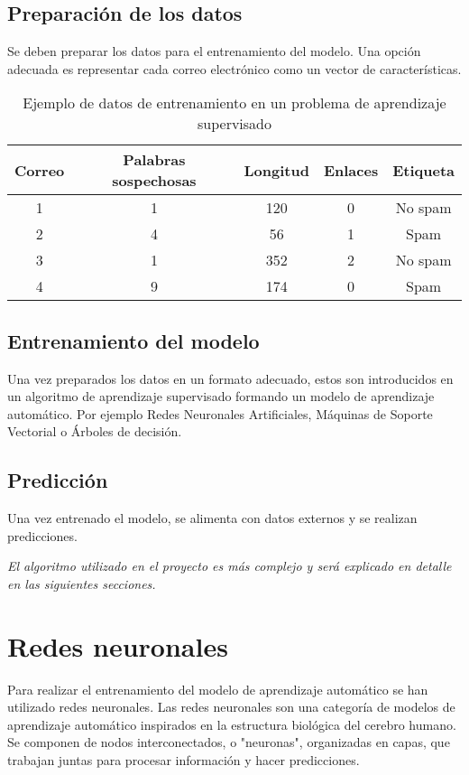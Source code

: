 \subsection{Preparación de los datos}
Se deben preparar los datos para el entrenamiento del modelo. 
Una opción adecuada es representar cada correo electrónico como un vector de características.

\begin{table}[ht]
\centering
\begin{tabular}{|c|c|c|c|c|}
\hline
\textbf{Correo} & \textbf{Palabras sospechosas} & \textbf{Longitud} & \textbf{Enlaces} & \textbf{Etiqueta} \\ \hline
1 & 1 & 120 & 0 & No spam \\
2 & 4 & 56 & 1 & Spam \\
3 & 1 & 352 & 2 & No spam \\
4 & 9 & 174 & 0 & Spam \\
\hline
\end{tabular}
\caption{Ejemplo de datos de entrenamiento en un problema de aprendizaje supervisado}
\end{table}

\subsection{Entrenamiento del modelo}
Una vez preparados los datos en un formato adecuado, estos son introducidos en un algoritmo de aprendizaje supervisado formando un modelo de aprendizaje automático. Por ejemplo Redes Neuronales Artificiales, Máquinas de Soporte Vectorial o Árboles de decisión.

\subsection{Predicción}
Una vez entrenado el modelo, se alimenta con datos externos y se realizan predicciones.

\textit{El algoritmo utilizado en el proyecto es más complejo y será explicado en detalle en las siguientes secciones.}

\newpage

\section{Redes neuronales}
Para realizar el entrenamiento del modelo de aprendizaje automático se han utilizado redes neuronales. 
Las redes neuronales son una categoría de modelos de aprendizaje automático inspirados en la estructura biológica del cerebro humano. Se componen de nodos interconectados, o "neuronas", organizadas en capas, que trabajan juntas para procesar información y hacer predicciones.

